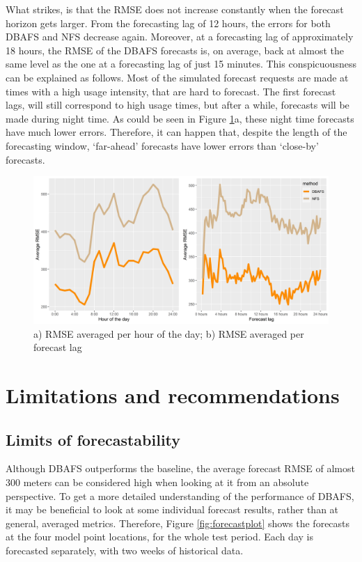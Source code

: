 \documentclass[12pt,oneside]{reedthesis}
\begin{document}
What strikes, is that the RMSE does not increase constantly when the
forecast horizon gets larger. From the forecasting lag of 12 hours, the
errors for both DBAFS and NFS decrease again. Moreover, at a forecasting
lag of approximately 18 hours, the RMSE of the DBAFS forecasts is, on
average, back at almost the same level as the one at a forecasting lag
of just 15 minutes. This conspicuousness can be explained as follows.
Most of the simulated forecast requests are made at times with a high
usage intensity, that are hard to forecast. The first forecast lags,
will still correspond to high usage times, but after a while, forecasts
will be made during night time. As could be seen in Figure
\ref{fig:timeandlag}a, these night time forecasts have much lower
errors. Therefore, it can happen that, despite the length of the
forecasting window, `far-ahead' forecasts have lower errors than
`close-by' forecasts.
\begin{figure}[h]
\includegraphics[width=\textwidth]{Figures/hourlag} \caption{a) RMSE averaged per hour of the day; b) RMSE averaged per forecast lag}\label{fig:timeandlag}
\end{figure}
\section{Limitations and
recommendations}\label{limitations-and-recommendations}

\subsection{Limits of forecastability}\label{limits-of-forecastability}

Although DBAFS outperforms the baseline, the average forecast RMSE of
almost 300 meters can be considered high when looking at it from an
absolute perspective. To get a more detailed understanding of the
performance of DBAFS, it may be beneficial to look at some individual
forecast results, rather than at general, averaged metrics. Therefore,
Figure \ref{fig:forecastplot} shows the forecasts at the four model
point locations, for the whole test period. Each day is forecasted
separately, with two weeks of historical data.
\end{document}
